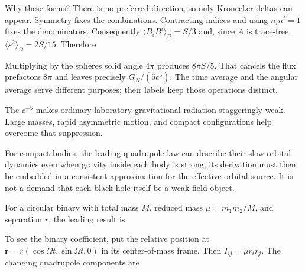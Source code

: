 \documentclass[
  11pt,
  letterpaper,
  oneside,
  openany]{scrbook}
\begin{document}
Why these forms? There is no preferred direction, so only Kronecker
deltas can appear. Symmetry fixes the combinations. Contracting indices
and using \(n_i n^i=1\) fixes the denominators. Consequently
\(\langle B_iB^i\rangle_\Omega=S/3\) and, since \(A\) is trace-free,
\(\langle s^2\rangle_\Omega=2S/15\). Therefore

\begin{center}
\begingroup
{}
\ifdim\wd\grmathbox>\linewidth
\resizebox{\linewidth}{!}{\usebox{\grmathbox}}
\else\usebox{\grmathbox}\fi
\endgroup
\end{center}

Multiplying by the sphere\textquotesingle s solid angle \(4\pi\)
produces \(8\pi S/5\). That cancels the flux prefactor\textquotesingle s
\(8\pi\) and leaves precisely \(G_N/(5c^5)\). The time average and the
angular average serve different purposes; their labels keep those
operations distinct.

The \(c^{-5}\) makes ordinary laboratory gravitational radiation
staggeringly weak. Large masses, rapid asymmetric motion, and compact
configurations help overcome that suppression.

For compact bodies, the leading quadrupole law can describe their slow
orbital dynamics even when gravity inside each body is strong; its
derivation must then be embedded in a consistent approximation for the
effective orbital source. It is not a demand that each black hole itself
be a weak-field object.

For a circular binary with total mass \(M\), reduced mass
\(\mu=m_1m_2/M\), and separation \(r\), the leading result is

\begin{center}
\begingroup
{}
\ifdim\wd\grmathbox>\linewidth
\resizebox{\linewidth}{!}{\usebox{\grmathbox}}
\else\usebox{\grmathbox}\fi
\endgroup
\end{center}

To see the binary coefficient, put the relative position at
\(\mathbf r=r(\cos\Omega t,\sin\Omega t,0)\) in its center-of-mass
frame. Then \(I_{ij}=\mu r_i r_j\). The changing quadrupole components
are

\begin{center}
\begingroup
{}
\ifdim\wd\grmathbox>\linewidth
\resizebox{\linewidth}{!}{\usebox{\grmathbox}}
\else\usebox{\grmathbox}\fi
\endgroup
\end{center}
\end{document}

